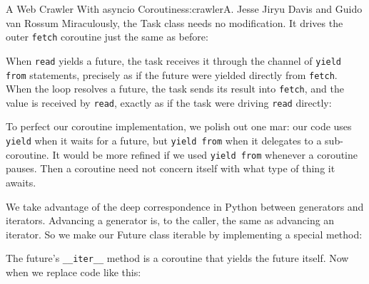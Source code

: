 \begin{aosachapter}{A Web Crawler With asyncio Coroutines}{s:crawler}{A. Jesse Jiryu Davis and Guido van Rossum}
Miraculously, the Task class needs no modification. It drives the outer
\texttt{fetch} coroutine just the same as before:

\begin{Shaded}
\begin{Highlighting}[]
\end{Highlighting}
\end{Shaded}

When \texttt{read} yields a future, the task receives it through the
channel of \texttt{yield from} statements, precisely as if the future
were yielded directly from \texttt{fetch}. When the loop resolves a
future, the task sends its result into \texttt{fetch}, and the value is
received by \texttt{read}, exactly as if the task were driving
\texttt{read} directly:


To perfect our coroutine implementation, we polish out one mar: our code
uses \texttt{yield} when it waits for a future, but \texttt{yield from}
when it delegates to a sub-coroutine. It would be more refined if we
used \texttt{yield from} whenever a coroutine pauses. Then a coroutine
need not concern itself with what type of thing it awaits.

We take advantage of the deep correspondence in Python between
generators and iterators. Advancing a generator is, to the caller, the
same as advancing an iterator. So we make our Future class iterable by
implementing a special method:

\begin{Shaded}
\begin{Highlighting}[]
     \NormalTok{(}\NormalTok{):}
         
         
\end{Highlighting}
\end{Shaded}

The future's \texttt{\_\_iter\_\_} method is a coroutine that yields the
future itself. Now when we replace code like this:

\begin{Shaded}
\begin{Highlighting}[]
 
\end{Highlighting}
\end{Shaded}


\end{aosachapter}
